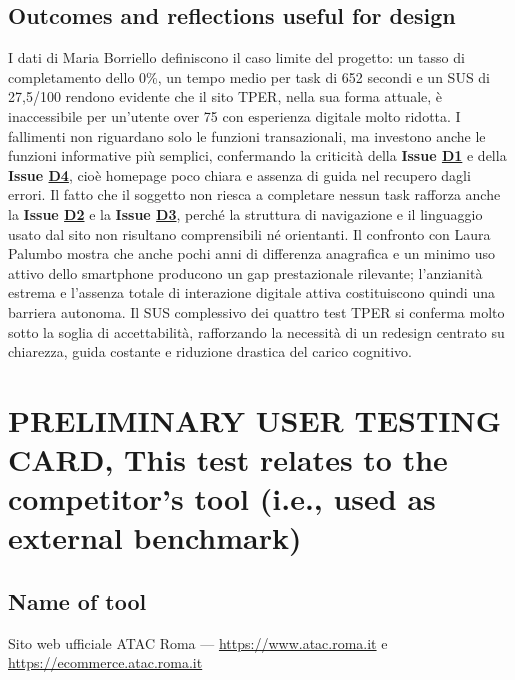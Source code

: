 \documentclass[11pt,a4paper]{article}
\begin{document}
\subsection*{Outcomes and reflections useful for design}
\begin{tcolorbox}[colback=backgroundColor,colframe=borderColor,arc=2mm]
I dati di Maria Borriello definiscono il caso limite del progetto: un tasso di completamento dello 0\%, un tempo medio per task di 652 secondi e un SUS di 27,5/100 rendono evidente che il sito TPER, nella sua forma attuale, è inaccessibile per un'utente over 75 con esperienza digitale molto ridotta. I fallimenti non riguardano solo le funzioni transazionali, ma investono anche le funzioni informative più semplici, confermando la criticità della \textbf{Issue \hyperref[iss:D1]{D1}} e della \textbf{Issue \hyperref[iss:D4]{D4}}, cioè homepage poco chiara e assenza di guida nel recupero dagli errori. Il fatto che il soggetto non riesca a completare nessun task rafforza anche la \textbf{Issue \hyperref[iss:D2]{D2}} e la \textbf{Issue \hyperref[iss:D3]{D3}}, perché la struttura di navigazione e il linguaggio usato dal sito non risultano comprensibili né orientanti. Il confronto con Laura Palumbo mostra che anche pochi anni di differenza anagrafica e un minimo uso attivo dello smartphone producono un gap prestazionale rilevante; l'anzianità estrema e l'assenza totale di interazione digitale attiva costituiscono quindi una barriera autonoma. Il SUS complessivo dei quattro test TPER si conferma molto sotto la soglia di accettabilità, rafforzando la necessità di un redesign centrato su chiarezza, guida costante e riduzione drastica del carico cognitivo.
\end{tcolorbox}
\newpage

\newpage

\section{PRELIMINARY USER TESTING CARD, This test relates to the competitor's tool (i.e., used as external benchmark)}
\vspace{0.2cm}

\subsection*{Name of tool}
\begin{tcolorbox}[colback=backgroundColor,colframe=borderColor,arc=2mm]
Sito web ufficiale ATAC Roma --- \url{https://www.atac.roma.it} e \url{https://ecommerce.atac.roma.it}
\end{tcolorbox}
\end{document}
